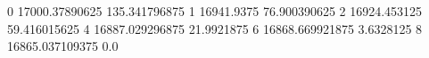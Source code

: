 0 17000.37890625 135.341796875
1 16941.9375 76.900390625
2 16924.453125 59.416015625
4 16887.029296875 21.9921875
6 16868.669921875 3.6328125
8 16865.037109375 0.0
